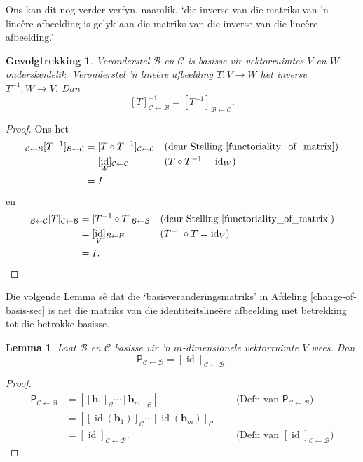 \documentclass[a4paper,11pt]{book}
\newtheorem{corollary}[theorem]{Gevolgtrekking}
\newtheorem{lemma}[theorem]{Lemma}
\theoremstyle{definition}
\newcommand{\ve}[1]{\mathbf{#1}}
\newcommand{\mat}[1]{\mathsf{#1}}
\newcommand{\basis}[1]{{\mathcal #1}}
\DeclareMathOperator{\id}{id}
\begin{document}
Ons kan dit nog verder verfyn, naamlik, `die inverse van die matriks van 'n
line{\^e}re afbeelding is gelyk aan die matriks van die inverse van die
line{\^e}re afbeelding.'
\begin{corollary} \label{inverse-of-map-via-matrices} Veronderstel
	$\basis{B}$ en $\basis{C}$ is basisse vir vektorruimtes $V$ en $W$
	onderskeidelik. Veronderstel 'n line{\^e}re afbeelding $T : V
	\rightarrow W$ het inverse $T^{-1} : W \rightarrow V$. Dan
	\[
		[T]_{\basis{C} \leftarrow \basis{B}}^{-1} = [T^{-1}]_{\basis{B}
		\leftarrow \basis{C}}.
	\]
\end{corollary}
\begin{proof}
	Ons het
	\begin{align*}
		[T]_{\basis{C} \leftarrow \basis{B}} [T^{-1}]_{\basis{B} \leftarrow
		\basis{C}} &= [T \circ T^{-1}]_{\basis{C} \leftarrow \basis{C}} &&
		\mbox{(deur Stelling \ref{functoriality_of_matrix})} \\
		&= [\id_W]_{\basis{C} \leftarrow \basis{C}} && \mbox{($T \circ
		T^{-1} = \id_W$)} \\
		&= I
	\end{align*}
	en
	\begin{align*}
		[T^{-1}]_{\basis{B} \leftarrow \basis{C}} [T]_{\basis{C} \leftarrow
		\basis{B}} &= [T^{-1} \circ T]_{\basis{B} \leftarrow \basis{B}} &&
		\mbox{(deur Stelling \ref{functoriality_of_matrix})} \\
		&= [\id_V]_{\basis{B} \leftarrow \basis{B}} && \mbox{($T^{-1} \circ
		T = \id_V$)} \\
		&= I.
	\end{align*}
\end{proof}

Die volgende Lemma s{\^e} dat die `basisveranderingsmatriks' in Afdeling
\ref{change-of-basis-sec} is net die matriks van die identiteitsline{\^e}re
afbeelding met betrekking tot die betrokke basisse.

\begin{lemma} \label{change-of-basis-as-matrix}Laat $\basis{B}$ en
	$\basis{C}$ basisse vir 'n $m$-dimensionele vektorruimte $V$ wees. Dan
	\[
		\mat{P}_{\basis{C} \leftarrow \basis{B}} = [\id]_{\basis{C}
		\leftarrow \basis{B}}.
	\]
\end{lemma}
\begin{proof} 
	\begin{align*} 
		\mat{P}_{\basis{C} \leftarrow \basis{B}} &= \left[
			[\ve{b}_1]_{\basis{C}} \cdots [\ve{b}_m]_{\basis{C}} \right] &&
		\mbox{(Defn van $\mat{P}_{\basis{C} \leftarrow \basis{B}}$)}  \\
		&= \left[ [\id(\ve{b}_1)]_{\basis{C}} \cdots
		[\id(\ve{b}_m)]_{\basis{C}} \right] \\
		&= [\id]_{\basis{C} \leftarrow \basis{B}}. && \mbox{(Defn van
		$[\id]_{\basis{C} \leftarrow \basis{B}}$)}
	\end{align*}
\end{proof}
\end{document}
